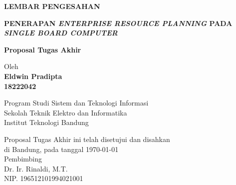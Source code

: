 \documentclass[12pt,a4paper,oneside]{book}
\begin{document}
\newpage
\thispagestyle{empty}
\begin{center}
  \textbf{\large LEMBAR PENGESAHAN}\\[1cm]
  \vspace*{1.5cm}

  {\large\bfseries PENERAPAN \textit{ENTERPRISE RESOURCE PLANNING} PADA \textit{SINGLE BOARD COMPUTER}}\\
     \vspace{2cm}

  {\Large \textbf{Proposal Tugas Akhir}}\\


  \vspace{1.5cm}
    
    
  {\large Oleh}\\[0.3cm]
    \textbf{
    {\large Eldwin Pradipta}\\
    {\large 18222042}
  }\\
    
  \vspace{0.5cm}
 
  {\large Program Studi Sistem dan Teknologi Informasi}\\
  {\large Sekolah Teknik Elektro dan Informatika}\\
  {\large Institut Teknologi Bandung}\\

  \vspace{1.5cm}

  Proposal Tugas Akhir ini telah disetujui dan disahkan\\ 
  di Bandung, pada tanggal \today\\[1cm]

	Pembimbing  \\[3cm]
  Dr. Ir. Rinaldi, M.T.   \\[0.2cm]
  NIP. 196512101994021001

\end{center}

\vspace{1cm}
\noindent

\end{document}
